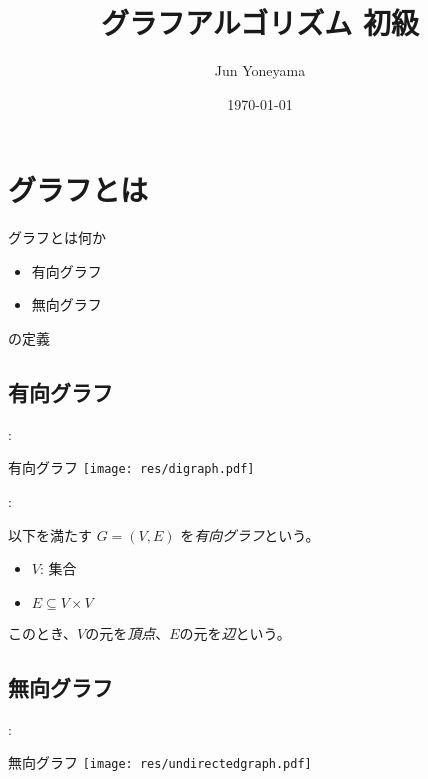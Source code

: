 \documentclass[dvipdfmx]{beamer}
\title{グラフアルゴリズム 初級}
\author{Jun Yoneyama}
\date{\today}
\begin{document}
\frame{\maketitle}

\section{グラフとは}

\begin{frame}{\insertsection}
  \begin{block}{グラフとは何か}
    \begin{itemize}
      \item 有向グラフ
      \item 無向グラフ
    \end{itemize}
    の定義
  \end{block}
\end{frame}

\subsection{有向グラフ}

\begin{frame}{\insertsection: \insertsubsection}
  \begin{block}{有向グラフ}
    \centering
    \texttt{[image: res/digraph.pdf]}
  \end{block}
\end{frame}

\begin{frame}{\insertsection: \insertsubsection}
  \begin{definition}
    以下を満たす $G = (V, E)$ を\emph{有向グラフ}という。
    \begin{itemize}
      \item $V$: 集合
      \item $E \subseteq V \times V$
    \end{itemize}
    このとき、$V$の元を\emph{頂点}、$E$の元を\emph{辺}という。
  \end{definition}
\end{frame}

\subsection{無向グラフ}

\begin{frame}{\insertsection: \insertsubsection}
  \begin{block}{無向グラフ}
    \centering
    \texttt{[image: res/undirectedgraph.pdf]}
  \end{block}
\end{frame}
\end{document}
